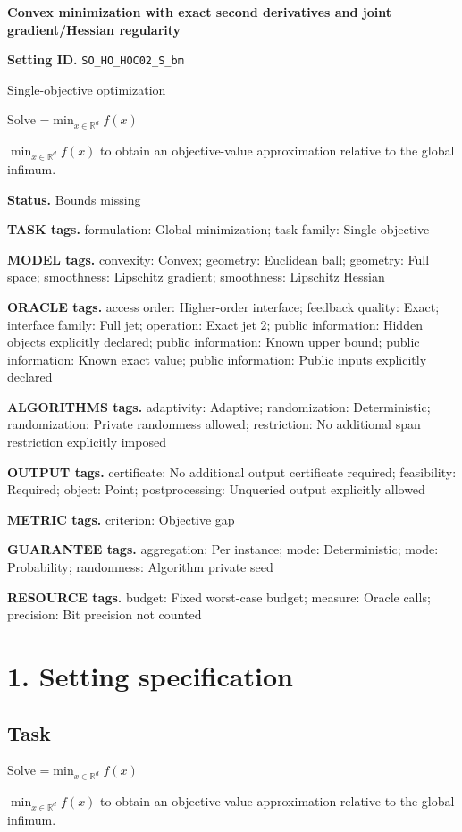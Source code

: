 \documentclass[10pt,a4paper]{article}
\newcommand{\AtlasMath}[1]{\par\begingroup\centering\setbox0=\hbox{$\displaystyle #1$}\ifdim\wd0>1.4\linewidth\typeout{ATLAS WIDE FORMULA: \the\wd0}\fi\ifdim\wd0>\linewidth\resizebox{\linewidth}{!}{\box0}\else\box0\fi\par\endgroup}
\newcommand{\AtlasInlineMath}[1]{\begingroup\setbox0=\hbox{$#1$}\ifdim\wd0>.4\linewidth\endgroup\AtlasMath{#1}\else\endgroup$#1$\fi}
\begin{document}
\raggedright

{\LARGE\bfseries\sffamily\color{AtlasNavy} Convex minimization with exact second derivatives and joint gradient/Hessian regularity\par}\vspace{5pt}
\textbf{Setting ID.} \texttt{SO\_\allowbreak{}HO\_\allowbreak{}HOC02\_\allowbreak{}S\_\allowbreak{}bm}

Single-objective optimization

Solve \AtlasInlineMath{\min_{x\in \mathbb{R}^d}f(x)} to obtain an objective-value approximation relative to the global infimum.

\textbf{Status.} Bounds missing

\textbf{TASK tags.} formulation: Global minimization; task family: Single objective

\textbf{MODEL tags.} convexity: Convex; geometry: Euclidean ball; geometry: Full space; smoothness: Lipschitz gradient; smoothness: Lipschitz Hessian

\textbf{ORACLE tags.} access order: Higher-order interface; feedback quality: Exact; interface family: Full jet; operation: Exact jet 2; public information: Hidden objects explicitly declared; public information: Known upper bound; public information: Known exact value; public information: Public inputs explicitly declared

\textbf{ALGORITHMS tags.} adaptivity: Adaptive; randomization: Deterministic; randomization: Private randomness allowed; restriction: No additional span restriction explicitly imposed

\textbf{OUTPUT tags.} certificate: No additional output certificate required; feasibility: Required; object: Point; postprocessing: Unqueried output explicitly allowed

\textbf{METRIC tags.} criterion: Objective gap

\textbf{GUARANTEE tags.} aggregation: Per instance; mode: Deterministic; mode: Probability; randomness: Algorithm private seed

\textbf{RESOURCE tags.} budget: Fixed worst-case budget; measure: Oracle calls; precision: Bit precision not counted

\section{1. Setting specification}
\subsection{Task}
Solve \AtlasInlineMath{\min_{x\in \mathbb{R}^d}f(x)} to obtain an objective-value approximation relative to the global infimum.
\end{document}
